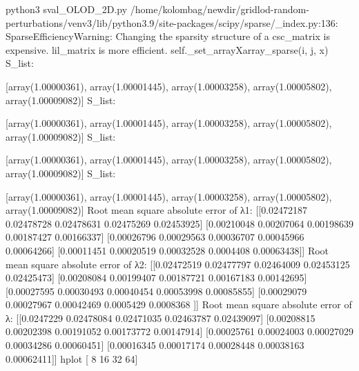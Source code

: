 python3 sval_OLOD_2D.py
/home/kolombag/newdir/gridlod-random-perturbations/venv3/lib/python3.9/site-packages/scipy/sparse/_index.py:136: SparseEfficiencyWarning: Changing the sparsity structure of a csc_matrix is expensive. lil_matrix is more efficient.
  self._set_arrayXarray_sparse(i, j, x)
S_list:

[array(1.00000361), array(1.00001445), array(1.00003258), array(1.00005802), array(1.00009082)]
S_list:

[array(1.00000361), array(1.00001445), array(1.00003258), array(1.00005802), array(1.00009082)]
S_list:

[array(1.00000361), array(1.00001445), array(1.00003258), array(1.00005802), array(1.00009082)]
S_list:

[array(1.00000361), array(1.00001445), array(1.00003258), array(1.00005802), array(1.00009082)]
Root mean square absolute error of λ1:
 [[0.02472187 0.02478728 0.02478631 0.02475269 0.02453925]
 [0.00210048 0.00207064 0.00198639 0.00187427 0.00166337]
 [0.00026796 0.00029563 0.00036707 0.00045966 0.00064266]
 [0.00011451 0.00020519 0.00032528 0.0004408  0.00063438]]
Root mean square absolute error of λ2: 
 [[0.02472519 0.02477797 0.02464009 0.02453125 0.02425473]
 [0.00208084 0.00199407 0.00187721 0.00167183 0.00142695]
 [0.00027595 0.00030493 0.00040454 0.00053998 0.00085855]
 [0.00029079 0.00027967 0.00042469 0.0005429  0.0008368 ]]
Root mean square absolute error of λ: 
 [[0.0247229  0.02478084 0.02471035 0.02463787 0.02439097]
 [0.00208815 0.00202398 0.00191052 0.00173772 0.00147914]
 [0.00025761 0.00024003 0.00027029 0.00034286 0.00060451]
 [0.00016345 0.00017174 0.00028448 0.00038163 0.00062411]]
hplot [ 8 16 32 64]